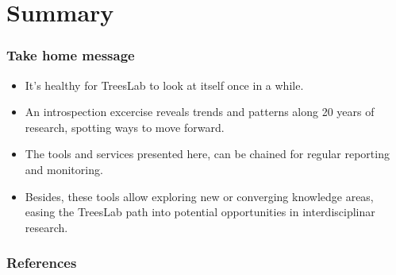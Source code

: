 \documentclass[aspectratio=169]{beamer}
\begin{document}
\section{Summary}


\begin{frame}
	\frametitle{Take home message}
	\begin{itemize}
		\item It's healthy for TreesLab to look at itself once in a while. 
        \item An introspection excercise reveals trends and patterns along 20 
            years of research, spotting ways to move forward.
        \item The tools and services presented here, can be chained for 
            regular reporting and monitoring. 
        \item Besides, these tools allow exploring new or converging 
            knowledge areas, easing the TreesLab path into potential 
            opportunities in interdisciplinar research.
	\end{itemize}
\end{frame}

\begin{frame}[allowframebreaks]
	\frametitle{References}
	\printbibliography
\end{frame}
\end{document}
